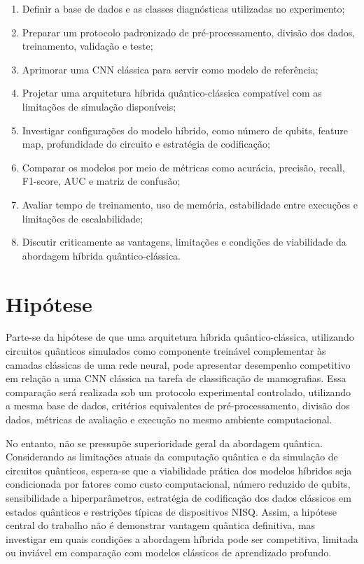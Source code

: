 \documentclass[
    12pt,
    openright,
    oneside,
    a4paper,
    english,
    brazil
]{abntex2}
\begin{document}
\begin{enumerate} 
    \item Definir a base de dados e as classes diagnósticas utilizadas no experimento;
    \item Preparar um protocolo padronizado de pré-processamento, divisão dos dados, treinamento, validação e teste;
    \item Aprimorar uma CNN clássica para servir como modelo de referência;
    \item Projetar uma arquitetura híbrida quântico-clássica compatível com as limitações de simulação disponíveis;
    \item Investigar configurações do modelo híbrido, como número de qubits, feature map, profundidade do circuito e estratégia de codificação;
    \item Comparar os modelos por meio de métricas como acurácia, precisão, recall, F1-score, AUC e matriz de confusão;
    \item Avaliar tempo de treinamento, uso de memória, estabilidade entre execuções e limitações de escalabilidade;
    \item Discutir criticamente as vantagens, limitações e condições de viabilidade da abordagem híbrida quântico-clássica.
\end{enumerate}



\section{Hipótese}

Parte-se da hipótese de que uma arquitetura híbrida quântico-clássica, utilizando circuitos quânticos simulados como componente treinável complementar às camadas clássicas de uma rede neural, pode apresentar desempenho competitivo em relação a uma CNN clássica na tarefa de classificação de mamografias. Essa comparação será realizada sob um protocolo experimental controlado, utilizando a mesma base de dados, critérios equivalentes de pré-processamento, divisão dos dados, métricas de avaliação e execução no mesmo ambiente computacional.

No entanto, não se pressupõe superioridade geral da abordagem quântica. Considerando as limitações atuais da computação quântica e da simulação de circuitos quânticos, espera-se que a viabilidade prática dos modelos híbridos seja condicionada por fatores como custo computacional, número reduzido de qubits, sensibilidade a hiperparâmetros, estratégia de codificação dos dados clássicos em estados quânticos e restrições típicas de dispositivos NISQ. Assim, a hipótese central do trabalho não é demonstrar vantagem quântica definitiva, mas investigar em quais condições a abordagem híbrida pode ser competitiva, limitada ou inviável em comparação com modelos clássicos de aprendizado profundo.
\end{document}
